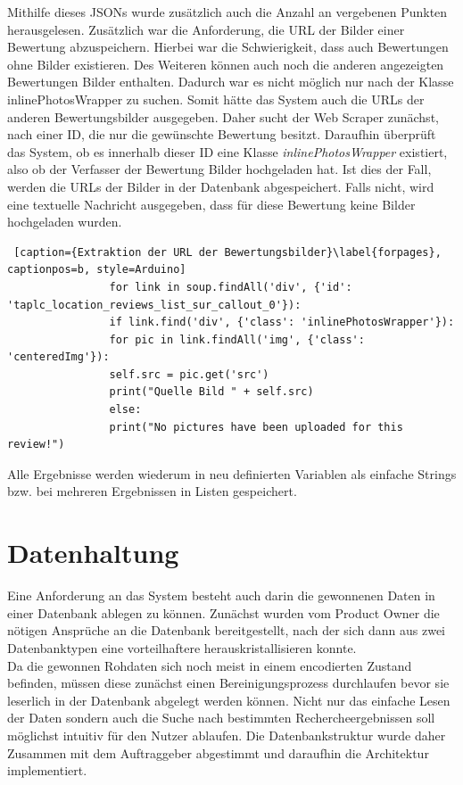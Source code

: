 \documentclass[a4paper,oneside,12pt]{report}
\begin{document}
				Mithilfe dieses JSONs wurde zusätzlich auch die Anzahl an vergebenen Punkten herausgelesen.  
				Zusätzlich war die Anforderung, die URL der Bilder einer Bewertung abzuspeichern. Hierbei war die Schwierigkeit, dass auch Bewertungen ohne Bilder existieren. Des Weiteren können auch noch die anderen angezeigten Bewertungen Bilder enthalten. Dadurch war es nicht möglich nur nach der Klasse inlinePhotosWrapper zu suchen. Somit hätte das System auch die URLs der anderen Bewertungsbilder ausgegeben.  
				Daher sucht der Web Scraper zunächst, nach einer ID, die nur die gewünschte Bewertung besitzt. Daraufhin überprüft das System, ob es innerhalb dieser ID eine Klasse \textit{inlinePhotosWrapper} existiert, also ob der Verfasser der Bewertung Bilder hochgeladen hat. Ist dies der Fall, werden die URLs der Bilder in der Datenbank abgespeichert. Falls nicht, wird eine textuelle Nachricht ausgegeben, dass für diese Bewertung keine Bilder hochgeladen wurden.
				\\
				\begin{lstlisting} [caption={Extraktion der URL der Bewertungsbilder}\label{forpages}, captionpos=b, style=Arduino]
				for link in soup.findAll('div', {'id': 'taplc_location_reviews_list_sur_callout_0'}):
				if link.find('div', {'class': 'inlinePhotosWrapper'}):
				for pic in link.findAll('img', {'class': 'centeredImg'}):
				self.src = pic.get('src')
				print("Quelle Bild " + self.src)
				else:
				print("No pictures have been uploaded for this review!")
				\end{lstlisting}
				
				Alle Ergebnisse werden wiederum in neu definierten Variablen als einfache Strings bzw. bei mehreren Ergebnissen in Listen gespeichert. 
			
		\section{Datenhaltung}
			Eine Anforderung an das System besteht auch darin die gewonnenen Daten in einer Datenbank ablegen zu können. Zunächst wurden vom Product Owner die nötigen Ansprüche an die Datenbank bereitgestellt, nach der sich dann aus zwei Datenbanktypen eine vorteilhaftere herauskristallisieren konnte. 
			\\
			Da die gewonnen Rohdaten sich noch meist in einem encodierten Zustand befinden, müssen diese zunächst einen Bereinigungsprozess durchlaufen bevor sie leserlich in der Datenbank abgelegt werden können. Nicht nur das einfache Lesen der Daten sondern auch die Suche nach bestimmten Rechercheergebnissen soll möglichst intuitiv für den Nutzer ablaufen. Die Datenbankstruktur wurde daher Zusammen mit dem Auftraggeber abgestimmt und daraufhin die Architektur implementiert.
		
\end{document}
